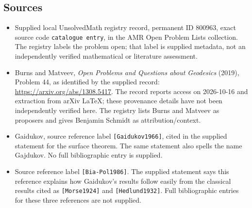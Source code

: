 \documentclass[11pt]{article}
\begin{document}
\subsection{Sources}
\begin{itemize}
\item Supplied local UnsolvedMath registry record, permanent ID \(800963\), exact source code \texttt{catalogue entry}, in the AMR Open Problem Lists collection. The registry labels the problem open; that label is supplied metadata, not an independently verified mathematical or literature assessment.
\item Burns and Matveev, \emph{Open Problems and Questions about Geodesics} (2019), Problem 44, as identified by the supplied record: \url{https://arxiv.org/abs/1308.5417}. The record reports access on 2026-10-16 and extraction from arXiv LaTeX; these provenance details have not been independently verified here. The registry lists Burns and Matveev as proposers and gives Benjamin Schmidt as attribution/context.
\item Gaidukov, source reference label \texttt{[Gaidukov1966]}, cited in the supplied statement for the surface theorem. The same statement also spells the name Gajdukov. No full bibliographic entry is supplied.
\item Source reference label \texttt{[Bia-Pol1986]}. The supplied statement says this reference explains how Gaidukov's results follow easily from the classical results cited as \texttt{[Morse1924]} and \texttt{[Hedlund1932]}. Full bibliographic entries for these three references are not supplied.
\end{itemize}
\end{document}
